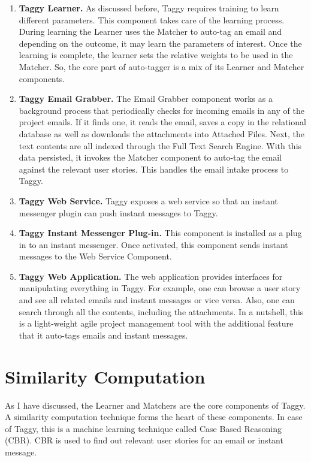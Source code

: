 \begin{enumerate}
	\item \textbf{Taggy Learner.} As discussed before, Taggy requires training to learn different parameters. This component takes care of the learning process. During learning the Learner uses the Matcher to auto-tag an email and depending on the outcome, it may learn the parameters of interest. Once the learning is complete, the learner sets the relative weights to be used in the Matcher. So, the core part of auto-tagger is a mix of its Learner and Matcher components.
	
	\item \textbf{Taggy Email Grabber.} The Email Grabber component works as a background process that periodically checks for incoming emails in any of the project emails. If it finds one, it reads the email, saves a copy in the relational database as well as downloads the attachments into Attached Files. Next, the text contents are all indexed through the Full Text Search Engine. With this data persisted, it invokes the Matcher component to auto-tag the email against the relevant user stories. This handles the email intake process to Taggy.
	
	\item \textbf{Taggy Web Service.} Taggy exposes a web service so that an instant messenger plugin can push instant messages to Taggy.
	
	\item \textbf{Taggy Instant Messenger Plug-in.} This component is installed as a plug in to an instant messenger. Once activated, this component sends instant messages to the Web Service Component.
	
	\item \textbf{Taggy Web Application.} The web application provides interfaces for manipulating everything in Taggy. For example, one can browse a user story and see all related emails and instant messages or vice versa. Also, one can search through all the contents, including the attachments. In a nutshell, this is a light-weight agile project management tool with the additional feature that it auto-tags emails and instant messages.
\end{enumerate}

\section{Similarity Computation}
As I have discussed, the Learner and Matchers are the core components of Taggy. A similarity computation technique forms the heart of these components. In case of Taggy, this is a machine learning technique called Case Based Reasoning (CBR). CBR is used to find out relevant user stories for an email or instant message. 

